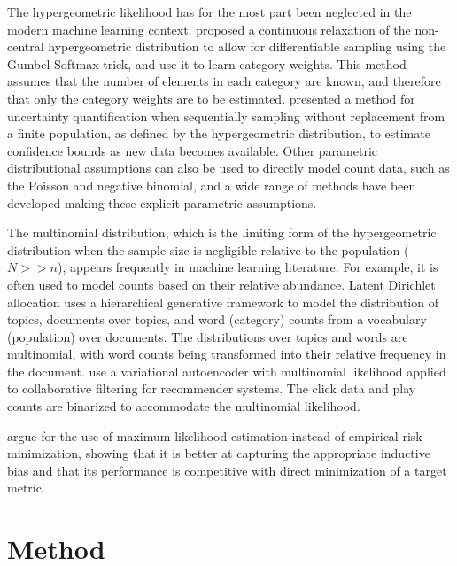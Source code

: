 \documentclass{article}
\theoremstyle{plain}
\theoremstyle{definition}
\theoremstyle{remark}
\begin{document}
The hypergeometric likelihood has for the most part been neglected in the modern machine learning context.
\citet{sutter_learning_2022} proposed a continuous relaxation of the non-central hypergeometric distribution to allow for differentiable sampling using the Gumbel-Softmax trick, and use it to learn category weights. This method assumes that the number of elements in each category are known, and therefore that only the category weights are to be estimated. \citet{waudby-smith_confidence_2020} presented a method for uncertainty quantification when sequentially sampling without replacement from a finite population, as defined by the hypergeometric distribution, to estimate confidence bounds as new data becomes available. Other parametric distributional assumptions can also be used to directly model count data, such as the Poisson and negative binomial, and a wide range of methods have been developed making these explicit parametric assumptions.

The multinomial distribution, which is the limiting form of the hypergeometric distribution when the sample size is negligible relative to the population ($N>>n$), appears frequently in machine learning literature. For example, it is often used to model counts based on their relative abundance. Latent Dirichlet allocation \citep{lda_blei_2003} uses a hierarchical generative framework to model the distribution of topics, documents over topics, and word (category) counts from a vocabulary (population) over documents. The distributions over topics and words are multinomial, with word counts being transformed into their relative frequency in the document.
\cite{liang_variational_2018} use a variational autoencoder with multinomial likelihood applied to collaborative filtering for recommender systems. The click data and play counts are binarized to accommodate the multinomial likelihood. 

\citet{awasthi2021benefits} argue for the use of maximum likelihood estimation instead of empirical risk minimization, showing that it is better at capturing the appropriate inductive bias and that its performance is competitive with direct minimization of a target metric.

\section{Method}
\end{document}
